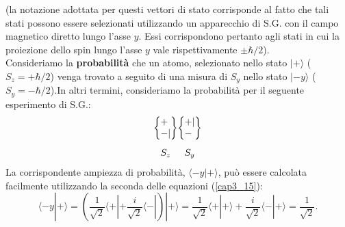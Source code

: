 \documentclass[a4paper,12pt,oneside]{book}
\begin{document}
(la notazione adottata per questi vettori di stato corrisponde al fatto che tali stati possono essere selezionati utilizzando un apparecchio di S.G. con il campo  magnetico diretto lungo l'asse $y$. Essi corrispondono pertanto agli stati in cui la proiezione dello spin lungo l'asse $y$ vale rispettivamente $\pm \hbar/2$).\\

Consideriamo la \textbf{probabilità} che un atomo, selezionato nello stato $| + \rangle$ ($S_z=+\hbar/2$) venga trovato a seguito di una misura di $S_y$ nello stato $| -y \rangle$ ($S_y=-\hbar/2$).In altri termini, consideriamo la probabilità per il seguente esperimento di S.G.:
	\begin{equation}
		\begin{matrix}
		\begin{Bmatrix}
		 +\makebox[\widthof{$|$}]{$\ $} \\ - |  
		\end{Bmatrix} \\[0.5cm]
		S_z
		\end{matrix}
		\begin{matrix}
		\begin{Bmatrix}
		 + | \\ - \makebox[\widthof{$|$}]{$\ $} 
		\end{Bmatrix}\\[0.5cm]
		S_y
		\end{matrix}
	\end{equation}
La corrispondente ampiezza di probabilità, $\langle -y | + \rangle$, può essere calcolata facilmente utilizzando la seconda delle equazioni (\ref{cap3_15}):
	\begin{equation}
		\langle -y | + \rangle = \left( \frac{1}{\sqrt{2}}\langle + |  + \frac{i}{\sqrt{2}}\langle - |  \right ) |+ \rangle = \frac{1}{\sqrt{2}}\langle + | + \rangle +\frac{i}{\sqrt{2}}\langle - | + \rangle = \frac{1}{\sqrt{2}} .
	\end{equation}
\end{document}
